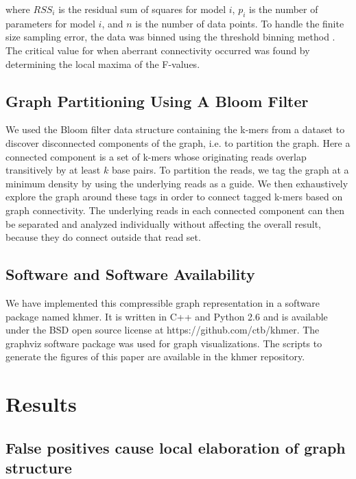 \documentclass[12pt]{article} \usepackage{simplemargins}
\begin{document}
where $RSS_i$ is the residual sum of squares for model $i$, $p_i$ is 
the number of parameters for model $i$, and $n$ is the number of data 
points. To handle the finite size sampling error, the data was binned using the 
threshold binning method \cite{adami2002critical}. The critical value for 
when aberrant connectivity occurred was found by determining the local maxima 
of the F-values.

\subsection{Graph Partitioning Using A Bloom Filter}
We used the Bloom filter data structure containing the k-mers from a
dataset to discover disconnected components of the graph, i.e. to
partition the graph.  Here a connected component is a set of k-mers
whose originating reads overlap transitively by at least $k$ base
pairs.  To partition the reads, we tag the graph at a minimum density
by using the underlying reads as a guide. We then exhaustively explore
the graph around these tags in order to connect tagged k-mers based on
graph connectivity.  The underlying reads in each connected component
can then be separated and analyzed individually without affecting the
overall result, because they do connect outside that read set.


\subsection{Software and Software Availability}

We have implemented this compressible graph representation in a
software package named khmer.  It is written in C++ and Python 2.6 and
is available under the BSD open source license at
https://github.com/ctb/khmer.  The graphviz software package was used
for graph visualizations. The scripts to generate the figures of this
paper are available in the khmer repository.

\section{Results}

\subsection{False positives cause local elaboration of graph structure}
\end{document}
